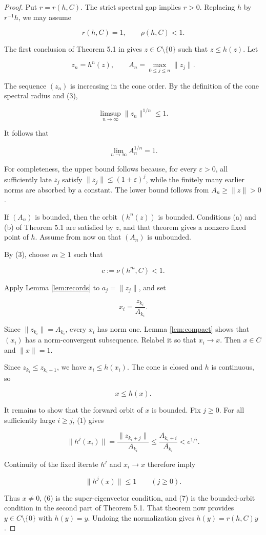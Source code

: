 \documentclass[11pt]{article}
\newcommand{\essrad}{\rho}
\begin{document}
\begin{proof}
Put \(r=r(h,C)\). The strict spectral gap implies \(r>0\). Replacing \(h\)
by \(r^{-1}h\), we may assume

\[
  r(h,C)=1,
  \qquad
  \essrad(h,C)<1. \tag{3}
\]

The first conclusion of Theorem 5.1 in \cite{AGN} gives
\(z\in C\setminus\{0\}\) such that \(z\le h(z)\). Let

\[
  z_n=h^n(z),
  \qquad
  A_n=\max_{0\le j\le n}\|z_j\|.
\]

The sequence \((z_n)\) is increasing in the cone order. By the definition of
the cone spectral radius and (3),

\[
  \limsup_{n\to\infty}\|z_n\|^{1/n}\le1.
\]

It follows that

\[
  \lim_{n\to\infty}A_n^{1/n}=1. \tag{4}
\]

For completeness, the upper bound follows because, for every
\(\varepsilon>0\), all sufficiently late \(z_j\) satisfy
\(\|z_j\|\le(1+\varepsilon)^j\), while the finitely many earlier norms are
absorbed by a constant. The lower bound follows from
\(A_n\ge\|z\|>0\).

If \((A_n)\) is bounded, then the orbit \((h^n(z))\) is bounded. Conditions
(a) and (b) of Theorem 5.1 are satisfied by \(z\), and that theorem gives a
nonzero fixed point of \(h\). Assume from now on that \((A_n)\) is unbounded.

By (3), choose \(m\ge1\) such that

\[
  c:=\nu(h^m,C)<1. \tag{5}
\]

Apply Lemma \ref{lem:records} to \(a_j=\|z_j\|\), and set

\[
  x_i=\frac{z_{k_i}}{A_{k_i}}.
\]

Since \(\|z_{k_i}\|=A_{k_i}\), every \(x_i\) has norm one. Lemma
\ref{lem:compact} shows that \((x_i)\) has a norm-convergent subsequence.
Relabel it so that \(x_i\to x\). Then \(x\in C\) and \(\|x\|=1\).

Since \(z_{k_i}\le z_{k_i+1}\), we have \(x_i\le h(x_i)\). The cone is
closed and \(h\) is continuous, so

\[
  x\le h(x). \tag{6}
\]

It remains to show that the forward orbit of \(x\) is bounded. Fix
\(j\ge0\). For all sufficiently large \(i\ge j\), (1) gives

\[
 \|h^j(x_i)\|
 =\frac{\|z_{k_i+j}\|}{A_{k_i}}
 \le\frac{A_{k_i+i}}{A_{k_i}}
 <e^{1/i}.
\]

Continuity of the fixed iterate \(h^j\) and \(x_i\to x\) therefore imply

\[
  \|h^j(x)\|\le1 \qquad(j\ge0). \tag{7}
\]

Thus \(x\ne0\), (6) is the super-eigenvector condition, and (7) is the
bounded-orbit condition in the second part of Theorem 5.1. That theorem now
provides \(y\in C\setminus\{0\}\) with \(h(y)=y\). Undoing the normalization
gives \(h(y)=r(h,C)y\).
\end{proof}
\end{document}
